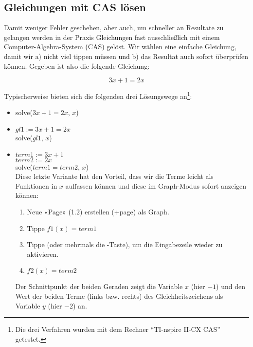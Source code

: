 
\subsection{Gleichungen mit CAS lösen}
Damit weniger Fehler geschehen, aber auch, um schneller an Resultate zu gelangen werden in der Praxis Gleichungen fast ausschließlich mit einem Computer-Algebra-System (CAS) gelöst.
Wir wählen eine einfache Gleichung, damit wir a) nicht viel tippen müssen und b) das Resultat auch sofort überprüfen können. Gegeben ist also die folgende Gleichung:

$$3x+1=2x$$

Typischerweise bieten sich die folgenden drei Lösungswege an\footnote{Die drei Verfahren wurden mit dem Rechner ``TI-nspire II-CX CAS'' getestet.}:
\begin{itemize}
\item solve($3x+1=2x$, $x$)
\item $gl1 := 3x+1=2x$\\
  solve($gl1$, $x$)
  
\item $term1 := 3x+1$\\
  $term2 := 2x$\\
  solve($term1=term2$, $x$)\\
  Diese letzte Variante hat den Vorteil, dass wir die Terme leicht als Funktionen in $x$ auffassen können und diese im Graph-Modus sofort anzeigen können:
  \begin{enumerate}
    \item Neue «Page» (1.2) erstellen (+page) als Graph. 
    \item Tippe $f1(x)=term1$
    \item Tippe   (oder mehrmals die -Taste), um die Eingabezeile wieder zu aktivieren.
      \item $f2(x)=term2$
  \end{enumerate}

  Der Schnittpunkt der beiden Geraden zeigt die Variable $x$ (hier $-1$) und den Wert der beiden Terme (links bzw. rechts) des Gleichheitszeichens als Variable $y$ (hier $-2$) an.

\end{itemize}

